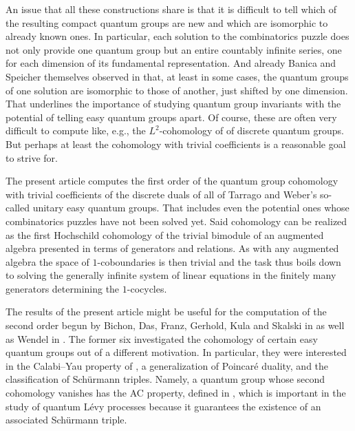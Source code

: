 \documentclass[10pt,a4paper]{amsart}
\numberwithin{equation}{section}
\begin{document}
An issue that all these constructions share is that it is difficult to tell which of the resulting compact quantum groups are new and which are isomorphic to already known ones. In particular, each solution to the combinatorics puzzle does not only provide one quantum group but an entire countably infinite series, one for each dimension of its fundamental representation. And already  Banica and Speicher themselves observed in \cite[Proposition~2.4\,(4)]{BanicaSpeicher2009} that, at least in some cases, the quantum groups of one solution are isomorphic to those of another, just shifted by one dimension. That underlines the importance of studying quantum group invariants with the potential of telling easy quantum groups apart. Of course, these are often very difficult to compute like, e.g., the $L^2$-cohomology of \cite{Kyed2008a} of discrete quantum groups. But perhaps at least the cohomology with trivial coefficients is a reasonable goal to strive for.

The present article computes the first order of the quantum group cohomology with trivial coefficients of the discrete duals of all of  Tarrago and Weber's so-called unitary easy quantum groups. That includes even the potential  ones whose combinatorics puzzles have not been solved yet. Said cohomology can be realized as the first Hochschild cohomology of the trivial bimodule of an augmented algebra presented in terms of generators and relations. As with any augmented algebra the space of $1$-coboundaries is then trivial and the task thus boils down to solving the generally infinite system of linear equations in the finitely many generators determining the $1$-cocycles.

The results of the present article might be useful for the computation of the second order begun by Bichon, Das, Franz, Gerhold, Kula and Skalski in \cite{BichonFranzGerhold2017, DasFranzKulaSkalski2018} as well as Wendel in \cite{Wendel2020}. The former six investigated the cohomology of certain easy quantum groups out of a different motivation. In particular, they were interested in the Calabi--Yau property of \cite{Ginzburg2006}, a generalization of  Poincar\'e duality, and the classification of Sch\"urmann triples. Namely, a quantum group whose second cohomology vanishes has the AC property, defined in \cite{FranzGerholdThom2015}, which is important in the study of quantum L\'evy processes because it guarantees the existence of an associated Sch\"urmann triple.
\end{document}
